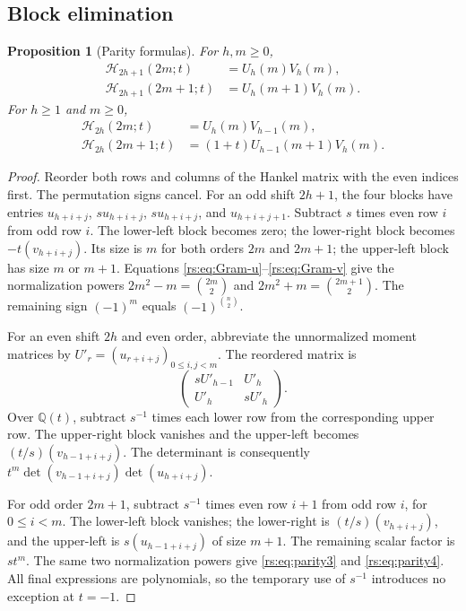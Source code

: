 \documentclass[11pt]{article}
\newtheorem{proposition}[theorem]{Proposition}
\theoremstyle{definition}
\theoremstyle{remark}
\newcommand{\Q}{\mathbb Q}
\newcommand{\Ht}{\mathcal H}
\theoremstyle{definition}
\theoremstyle{plain}
\numberwithin{equation}{section}
\begin{document}
\subsection{Block elimination}
\begin{proposition}[Parity formulas]
\label{rs:prop:parity}
For $h,m\ge0$,
\begin{align}
 \Ht_{2h+1}(2m;t)&=U_h(m)V_h(m),\label{rs:eq:parity1}\\
 \Ht_{2h+1}(2m+1;t)&=U_h(m+1)V_h(m).
 \label{rs:eq:parity2}
\end{align}
For $h\ge1$ and $m\ge0$,
\begin{align}
 \Ht_{2h}(2m;t)&=U_h(m)V_{h-1}(m),\label{rs:eq:parity3}\\
 \Ht_{2h}(2m+1;t)&=(1+t)U_{h-1}(m+1)V_h(m).
 \label{rs:eq:parity4}
\end{align}
\end{proposition}
\begin{proof}
Reorder both rows and columns of the Hankel matrix with the even indices
first. The permutation signs cancel. For an odd shift $2h+1$, the four
blocks have entries $u_{h+i+j}$, $s u_{h+i+j}$, $s u_{h+i+j}$, and
$u_{h+i+j+1}$. Subtract $s$ times even row $i$ from odd row $i$.
The lower-left block becomes zero; the lower-right block becomes
$-t(v_{h+i+j})$. Its size is $m$ for both orders $2m$ and $2m+1$;
the upper-left block has size $m$ or $m+1$. Equations
\eqref{rs:eq:Gram-u}--\eqref{rs:eq:Gram-v} give the normalization powers
$2m^2-m=\binom{2m}{2}$ and $2m^2+m=\binom{2m+1}{2}$.
The remaining sign $(-1)^m$ equals $(-1)^{\binom n2}$.

For an even shift $2h$ and even order, abbreviate the unnormalized moment
matrices by $U'_r=(u_{r+i+j})_{0\le i,j<m}$. The reordered matrix is
\[
 \begin{pmatrix}sU'_{h-1}&U'_h\\ U'_h&sU'_h\end{pmatrix}.
\]
Over $\Q(t)$, subtract $s^{-1}$ times each lower row from the corresponding
upper row. The upper-right block vanishes and the upper-left becomes
$(t/s)(v_{h-1+i+j})$. The determinant is consequently
$t^m\det(v_{h-1+i+j})\det(u_{h+i+j})$.

For odd order $2m+1$, subtract $s^{-1}$ times even row $i+1$ from odd
row $i$, for $0\le i<m$. The lower-left block vanishes; the lower-right
is $(t/s)(v_{h+i+j})$, and the upper-left is
$s(u_{h-1+i+j})$ of size $m+1$. The remaining scalar factor is $s t^m$.
The same two normalization powers give \eqref{rs:eq:parity3} and
\eqref{rs:eq:parity4}. All final expressions are polynomials, so the temporary
use of $s^{-1}$ introduces no exception at $t=-1$.
\end{proof}
\end{document}
